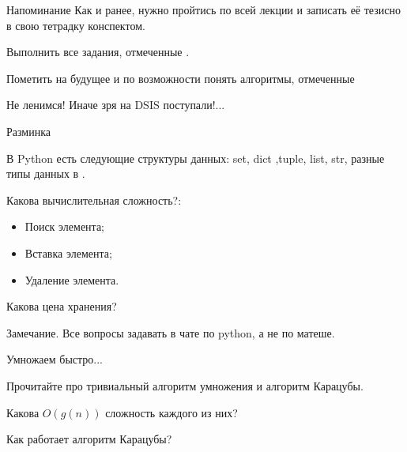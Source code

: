 \begin{frame}
	\begin{block}{Напоминание}
		Как и ранее, нужно пройтись по всей лекции и записать её тезисно в свою тетрадку конспектом.
		
		Выполнить все задания, отмеченные .
		
		Пометить на будущее и по возможности понять алгоритмы, отмеченные 
		
		Не ленимся! Иначе зря на DSIS поступали!...
	\end{block}
\end{frame}


\begin{frame}{Разминка}
	

	В Python есть следующие структуры данных:
	set, dict ,tuple, list, str, разные типы данных в .
	
	
	Какова вычислительная сложность?:
	\begin{itemize}
		\item Поиск элемента;
		\item Вставка элемента;
		\item Удаление элемента.
	\end{itemize}

	Какова цена хранения?
	
	\begin{block}{Замечание.}
		Все вопросы задавать в чате по python, а не по матеше.
	\end{block}
	
	
\end{frame}

\begin{frame}{Умножаем быстро...}
	
	Прочитайте про тривиальный алгоритм умножения и алгоритм Карацубы.
	
	Какова $O(g(n))$ сложность каждого из них?
	
	Как работает алгоритм Карацубы?
	
\end{frame}

